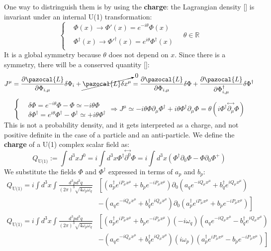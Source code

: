 \documentclass[../main.tex]{subfiles}
\begin{document}
One way to distringuish them is by using the \textbf{charge}: the Lagrangian density [] is invariant under an internal U(1) transformation:
\[
\left\{
\begin{aligned}
&\Phi(x)\xrightarrow[]{}\Phi'(x)=e^{-i\theta}\Phi(x)\\
&\Phi^\dagger(x)\xrightarrow[]{}\Phi'^\dagger(x)=e^{i\theta}\Phi^\dagger(x)
\end{aligned}
\right.
\quad \theta\in\mathbb{R}
\]
It is a global symmetry because $\theta$ does not depend on $x$. Since there is a symmetry, there will be a conserved quantity []:
\[
J^\mu=\frac{\partial\pazocal{L}}{\partial\Phi_{i,\mu}}\delta\Phi_i+\cancelto{0}{\pazocal{L}\delta x^\mu}=\frac{\partial\pazocal{L}}{\partial\Phi_{i,\mu}}\delta\Phi+\frac{\partial\pazocal{L}}{\partial\Phi^\dagger_{i,\mu}}\delta\Phi^\dagger
\]
\[
\left\{
\begin{aligned}
&\delta\Phi=e^{-i\theta}\Phi-\Phi\simeq-i\theta\Phi\\
&\delta\Phi^\dagger=e^{i\theta}\Phi^\dagger-\Phi^\dagger\simeq+i\theta\Phi^\dagger
\end{aligned}
\right.
\Rightarrow J^\mu\simeq-i\theta\Phi\partial_\mu\Phi^\dagger+i\theta\Phi^\dagger\partial_\mu\Phi=\theta(i\Phi^\dagger\overset{\leftrightarrow}{\partial_\mu}\Phi)
\]
This is not a probability density, and it gets interpreted as a charge, and not positive definite in the case of a particle and an anti-particle. We define the \textbf{charge} of a U(1) complex scalar field as:
\[
Q_{\text{U(1)}}:=\int d^3xJ^0=i\int d^3x\Phi^\dagger\overset{\leftrightarrow}{\partial^0}\Phi=i\int d^3x(\Phi^\dagger\partial_0\Phi-\Phi\partial_0\Phi^+)
\]
We substitute the fields $\Phi$ and $\Phi^\dagger$ expressed in terms of $a_p$ and $b_p$:
\begin{align*}
Q_{\text{U(1)}}=i\int d^3x\int \frac{d^3pd^3q}{(2\pi)^3\sqrt{4\omega_p\omega_q}}&\left[(a^\dagger_pe^{iP_\mu x^\mu}+b_pe^{-iP_\mu x^\mu})\partial_0(a_qe^{-iQ_\mu x^\mu}+b^\dagger_qe^{iQ_\mu x^\mu})\right.\\
&\left.-(a_qe^{-iQ_\mu x^\mu}+b^\dagger_qe^{iQ_\mu x^\mu})\partial_0(a^\dagger_pe^{iP_\mu x^\mu}+b_pe^{-iP_\mu x^\mu})\right]\\
Q_{\text{U(1)}}=i\int d^3x\int \frac{d^3pd^3q}{(2\pi)^3\sqrt{4\omega_p\omega_q}}&\left[(a^\dagger_pe^{iP_\mu x^\mu}+b_pe^{-iP_\mu x^\mu})(-i\omega_q)(a_qe^{-iQ_\mu x^\mu}-b^\dagger_qe^{iQ_\mu x^\mu})\right.\\
&\left.-(a_qe^{-iQ_\mu x^\mu}+b^\dagger_qe^{iQ_\mu x^\mu})(i\omega_p)(a^\dagger_pe^{iP_\mu x^\mu}-b_pe^{-iP_\mu x^\mu})\right]
\end{align*}
\end{document}

